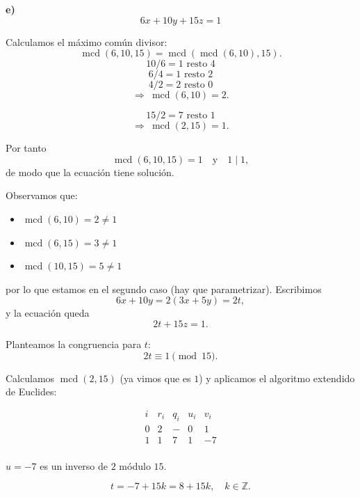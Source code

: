 \documentclass[a4paper,12pt]{article}
\begin{document}
\begin{ejercicio}[title=Ejercicio 33]

\textbf{e)} \\[0.3em]
\[
6x + 10y + 15z = 1
\]

Calculamos el máximo común divisor:
\[
\operatorname{mcd}(6,10,15)=\operatorname{mcd}(\operatorname{mcd}(6,10),15).
\]
\[
10 / 6 = 1 \text{ resto } 4
\]
\[
6 / 4 = 1 \text{ resto } \boxed{2}
\]
\[
4 / 2 = 2 \text{ resto } 0
\]
\[
\Rightarrow\ \operatorname{mcd}(6,10)=2.
\]

\[
15 / 2 = 7 \text{ resto } \boxed{1}
\]
\[
\Rightarrow\ \operatorname{mcd}(2,15)=1.
\]

Por tanto
\[
\operatorname{mcd}(6,10,15)=1 \quad\text{y}\quad 1\mid 1,
\]
de modo que la ecuación tiene solución.

\vspace{0.5em}

Observamos que:
\begin{itemize}
    \item $\operatorname{mcd}(6,10)=2\ne 1$
    \item $\operatorname{mcd}(6,15)=3\ne 1$
    \item $\operatorname{mcd}(10,15)=5\ne 1$
\end{itemize}
por lo que estamos en el segundo caso (hay que parametrizar).  
Escribimos
\[
6x + 10y = 2(3x+5y)=2t,
\]
y la ecuación queda
\[
2t + 15z = 1.
\]

Planteamos la congruencia para $t$:
\[
2t \equiv 1 \pmod{15}.
\]

Calculamos $\operatorname{mcd}(2,15)$ (ya vimos que es $1$) y aplicamos el algoritmo extendido de Euclides:

\[
\begin{array}{c|c|c|c|c}
i & r_i & q_i & u_i & v_i \\ \hline
0 & 2 & - & 0 & 1 \\
1 & \boxed{1} & 7 & 1 & -7 \\
\end{array}
\]

$u=-7$ es un inverso de $2$ módulo $15$.

\[
t = -7 + 15k = 8 + 15k,\quad k\in\mathbb{Z}.
\]

\end{ejercicio}
\end{document}
